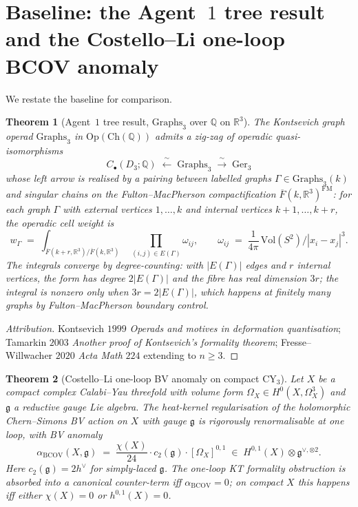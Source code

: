 \documentclass[11pt]{article}
\newtheorem{theorem}{Theorem}[section]
\providecommand{\CY}{\mathrm{CY}}
\providecommand{\BCOV}{\mathrm{BCOV}}
\providecommand{\Om}{\Omega}
\providecommand{\fg}{\mathfrak{g}}
\providecommand{\RR}{\mathbb{R}}
\providecommand{\QQ}{\mathbb{Q}}
\providecommand{\Ger}{\mathrm{Ger}}
\providecommand{\Graphs}{\mathrm{Graphs}}
\providecommand{\Op}{\mathrm{Op}}
\providecommand{\Ch}{\mathrm{Ch}}
\begin{document}
\tableofcontents

\section{Baseline: the Agent~$1$ tree result and the Costello--Li
one-loop BCOV anomaly}
\label{sec:baseline}

We restate the baseline for comparison.

\begin{theorem}[Agent~$1$ tree result, $\Graphs_3$ over $\QQ$ on
$\RR^3$]
\label{thm:agent-1-tree}
The Kontsevich graph operad $\Graphs_3$ in $\Op(\Ch(\QQ))$ admits a
zig-zag of operadic quasi-isomorphisms
\[
  C_\bullet(D_3; \QQ) \;\xleftarrow{\;\sim\;}\; \Graphs_3 \;\xrightarrow{\;\sim\;}\; \Ger_3
\]
whose left arrow is realised by a pairing between labelled graphs
$\Gamma \in \Graphs_3(k)$ and singular chains on the
Fulton--MacPherson compactification $\overline{F}(k, \RR^3)^{\mathrm{FM}}$:
for each graph $\Gamma$ with external vertices $1, \ldots, k$ and
internal vertices $k+1, \ldots, k+r$, the operadic cell weight is
\[
  w_\Gamma \;=\; \int_{\overline{F}(k+r, \RR^3) / \overline{F}(k, \RR^3)}
    \;\prod_{(i,j) \in E(\Gamma)} \omega_{ij},
  \qquad
  \omega_{ij} \;=\; \frac{1}{4\pi}\, \mathrm{Vol}(S^2) / |x_i - x_j|^3.
\]
The integrals converge by degree-counting:  with $|E(\Gamma)|$ edges
and $r$ internal vertices, the form has degree $2|E(\Gamma)|$ and the
fibre has real dimension $3r$; the integral is nonzero only when
$3r = 2|E(\Gamma)|$, which happens at finitely many graphs by
Fulton--MacPherson boundary control.
\end{theorem}

\begin{proof}[Attribution]
Kontsevich $1999$ \emph{Operads and motives in deformation
quantisation}; Tamarkin $2003$ \emph{Another proof of Kontsevich's
formality theorem};  Fresse--Willwacher $2020$ \emph{Acta Math}
$224$ extending to $n \geq 3$.
\end{proof}

\begin{theorem}[Costello--Li one-loop BV anomaly on compact $\CY_3$]
\label{thm:cl-one-loop-bv}
Let $X$ be a compact complex Calabi--Yau threefold with volume form
$\Om_X \in H^0(X, \Om^3_X)$ and $\fg$ a reductive gauge Lie algebra.
The heat-kernel regularisation of the holomorphic Chern--Simons BV
action on $X$ with gauge $\fg$ is rigorously renormalisable at one
loop, with BV anomaly
\[
  \alpha_{\BCOV}(X, \fg) \;=\; \frac{\chi(X)}{24} \cdot
    c_2(\fg) \cdot [\Om_X]^{0,1} \;\in\; H^{0,1}(X) \otimes \fg^{\vee,\otimes 2}.
\]
Here $c_2(\fg) = 2h^\vee$ for simply-laced $\fg$.  The one-loop KT
formality obstruction is absorbed into a canonical counter-term iff
$\alpha_\BCOV = 0$;  on compact $X$ this happens iff either
$\chi(X) = 0$ or $h^{0,1}(X) = 0$.
\end{theorem}
\end{document}
